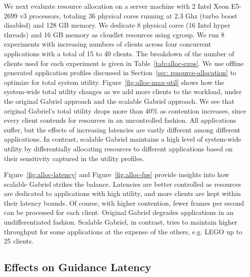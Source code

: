 We next evaluate resource allocation on a server machine with 2
Intel{\textregistered} Xeon{\textregistered} E5-2699 v3 processors, totaling 36
physical cores running at 2.3 Ghz (turbo boost disabled) and 128 GB memory. We
dedicate 8 physical cores (16 Intel{\textregistered} hyper threads) and 16 GB memory as cloudlet
resources using cgroup. We run 8 experiments with increasing numbers of clients
across four concurrent applications with a total of 15 to 40 clients. The
breakdown of the number of clients used for each experiment is given in
Table~\ref{tab:alloc-exps}. We use offline generated application profiles
discussed in Section~\ref{sec: resource-allocation} to optimize for total system
utility. Figure~\ref{fig:alloc-max-util} shows how the system-wide total utility
changes as we add more clients to the workload, under the original Gabriel
approach and the scalable Gabriel approach. We see that original Gabriel's total
utility drops more than 40\% as contention increases, since every client
contends for resources in an uncontrolled fashion.  All applications suffer, but
the effects of increasing latencies are vastly different among different
applications. In contrast, scalable Gabriel maintains a high level of
system-wide utility by differentially allocating resources to different
applications based on their sensitivity captured in the utility profiles.


Figure~\ref{fig:alloc-latency} and Figure~\ref{fig:alloc-fps} provide insights
into how scalable Gabriel strikes the balance. Latencies are better controlled
as resources are dedicated to applications with high utility, and more clients
are kept within their latency bounds. Of course, with higher contention, fewer
frames per second can be processed for each client. Original Gabriel degrades
applications in an undifferentiated fashion. Scalable Gabriel, in contrast,
tries to maintain higher throughput for some applications at the expense of the
others, e.g. LEGO up to 25 clients.


\subsection{Effects on Guidance Latency}

